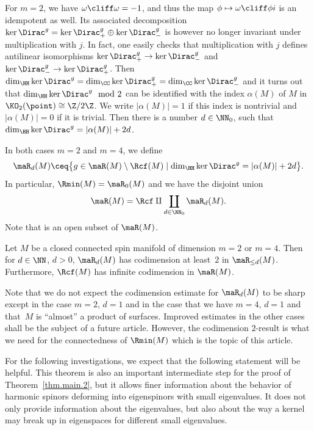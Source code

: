 For $m=2$, we have $\omega\cliff \omega=-1$, and thus the map $\phi\mapsto \omega\cliff \phi  i $ is an idempotent as well. Its associated decomposition $\ker\Dirac^g=\ker\Dirac^g_+\oplus \ker\Dirac^g_-$ is however no longer invariant under multiplication with $j$. In fact, one easily checks that multiplication with $j$ defines antilinear isomorphisms $\ker\Dirac^g_+\to\ker\Dirac^g_-$ and $\ker\Dirac^g_-\to\ker\Dirac^g_+$. Then ${\dim_\HH\ker\Dirac^g=\dim_\CC\ker\Dirac^g_+=\dim_\CC\ker\Dirac^g_-}$ and it turns out that $\dim_\HH\ker\Dirac^g\mod 2$ can be identified with the index $\alpha(M)$ of $M$ in $\KO_2(\point)\cong\Z/2\Z$. We write $|\alpha(M)|=1$ if this index is nontrivial and $|\alpha(M)|=0$ if it is trivial. Then there is a number $d\in \NN_0$, such that $\dim_\HH\ker\Dirac^g=|\alpha(M)|+2d$.

In both cases $m=2$ and $m=4$, we define
\[
\maR_d(M)\ceq \bigl\{g\in \maR(M)\setminus\Rcf(M)\mid \dim_\HH \ker \Dirac^{g}=|\alpha(M)|+2d\bigr\}.
\]
In particular, $\Rmin(M)=\maR_0(M)$ and we have the disjoint union
\[
\maR(M)=\Rcf\amalg \coprod_{d\in \NN_0}\maR_d(M).
\]
Note that  is an open subset of $\maR(M)$.

\begin{Theorem} \label{thm.main.2}
Let $M$ be a closed connected spin manifold of dimension $m=2$ or $m=4$. Then for $d\in \NN$, $d>0$, $\maR_d(M)$ has codimension at least~$2$ in $\maR_{\leq d}(M)$. Furthermore, $\Rcf(M)$ has infinite codimension in $\maR(M)$.
\end{Theorem}

Note that we do not expect the codimension estimate for $\maR_d(M)$ to be sharp except in the case $m=2$, $d=1$ and in the case that we have $m=4$, $d=1$ and that~$M$ is ``almost'' a product of surfaces.
Improved estimates in the other cases shall be the subject of a future article.
However, the codimension $2$-result is what we need for the connectedness of $\Rmin(M)$ which is the topic of this article.

For the following investigations, we expect that the following statement will be helpful.
This theorem is also an important intermediate step for the proof of Theorem~\ref{thm.main.2}, but it allows finer information about the behavior of harmonic spinors deforming into eigenspinors with small eigenvalues.
It does not only provide information about the eigenvalues, but also about the way a kernel may break up in eigenspaces for different small eigenvalues.


